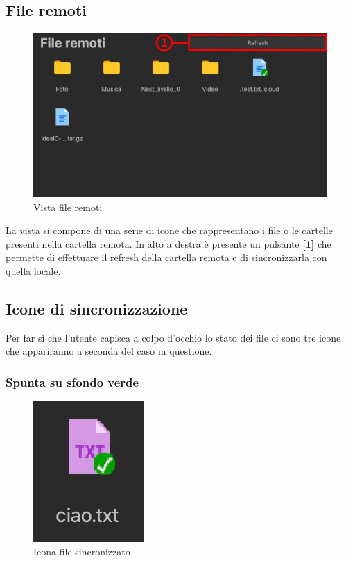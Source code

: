 \subsection{File remoti}
\label{sec:fileRemoti}
\begin{figure}[H]
    \centering
    \includegraphics[scale = 0.8]{components/img/fileRem.png}
    \caption{Vista file remoti}
    \label{fig:fileRem}
\end{figure}
La vista si compone di una serie di icone che rappresentano i file o le cartelle presenti nella cartella remota. In alto a destra è presente un pulsante \textbf{[1]} che permette di effettuare il refresh della cartella remota e di sincronizzarla con quella locale.

\subsection{Icone di sincronizzazione}
\label{sec:iconeSync}
Per far sì che l'utente capisca a colpo d'occhio lo stato dei file ci sono tre icone che appariranno a seconda del caso in questione.
\subsubsection{Spunta su sfondo verde}

\begin{figure}[H]
    \centering
    \includegraphics[scale = 0.8]{components/img/iconIsSync.png}
    \caption{Icona file sincronizzato}
    \label{fig:greenI}
\end{figure}

